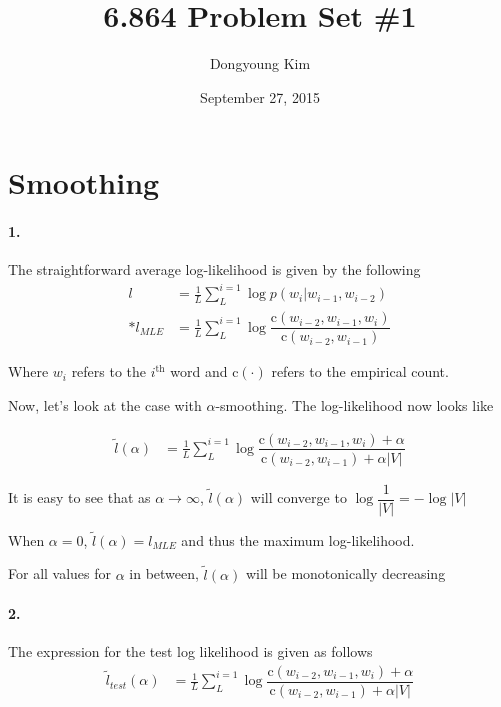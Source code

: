 \documentclass[10pt,letter]{article}
\begin{document}

\title{6.864 Problem Set \#1}

\author{Dongyoung Kim}

\date{September 27, 2015}
 
\maketitle 


\section*{Smoothing}

\paragraph*{1.}
The straightforward average log-likelihood is given by the following
\begin{align*}
l &= \frac{1}{L}\sum_{L}^{i=1}\log p(w_i|w_{i-1}, w_{i-2}) \\*
l_{MLE} &=  \frac{1}{L}\sum_{L}^{i=1} \log \dfrac{\text{c}(w_{i-2}, w_{i-1}, w_i)}{\text{c}(w_{i-2}, w_{i-1})}
\end{align*} 

Where  $w_i$ refers to the $i^\text{th}$ word and $\text{c}(\cdot) $ refers to the empirical count. 

Now, let's look at the case with $\alpha$-smoothing. The log-likelihood now looks like

\begin{align*}
\tilde{l}(\alpha) &=  \frac{1}{L}\sum_{L}^{i=1} \log \dfrac{\text{c}(w_{i-2}, w_{i-1}, w_i)  + \alpha}
{\text{c}(w_{i-2}, w_{i-1}) + \alpha|V|} 
\end{align*}

It is easy to see that as $\alpha \rightarrow \infty$, $\tilde{l}(\alpha)$ will converge to $\log\dfrac{1}{|V|}=-\log|V|$

When $\alpha=0$, $\tilde{l}(\alpha)=l_{MLE}$ and thus the maximum log-likelihood. 

For all values for $\alpha$ in between, $\tilde{l}(\alpha)$ will be monotonically decreasing

\paragraph*{2.}
The expression for the test log likelihood is given as follows
\begin{align*}
\tilde{l}_{test}(\alpha) &=  \frac{1}{L}\sum_{L}^{i=1} \log \dfrac{\text{c}(w_{i-2}, w_{i-1}, w_i)  + \alpha}
{\text{c}(w_{i-2}, w_{i-1}) + \alpha|V|} 
\end{align*}
\end{document}
